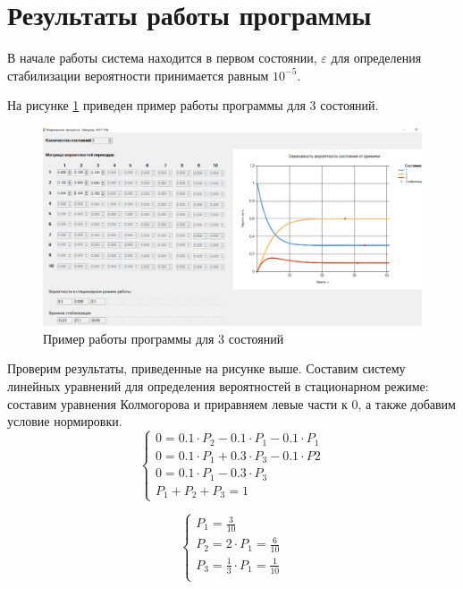 \documentclass[14pt, a4paper]{extarticle}
\begin{document}
\section{Результаты работы программы}

В начале работы система находится в первом состоянии, $\varepsilon$ для определения стабилизации вероятности принимается равным $10^{-5}$.



\newpage
На рисунке \ref{pic:1} приведен пример работы программы для 3 состояний.
\begin{figure}[h]
	\begin{center}
		{\includegraphics[scale=0.45]{pictures/1.png}
			\caption{Пример работы программы для 3 состояний}
			\label{pic:1}}
	\end{center}
\end{figure}

Проверим результаты, приведенные на рисунке выше. Составим систему линейных уравнений для определения вероятностей в стационарном режиме: составим уравнения Колмогорова и приравняем левые части к 0, а также добавим условие нормировки.
\begin{equation}
	\left\{\begin{array}{l}
		0 = 0.1 \cdot P_2 - 0.1 \cdot P_1 - 0.1 \cdot P_1 \\
		0 = 0.1 \cdot P_1 + 0.3 \cdot P_3 - 0.1 \cdot P2 \\
		0 = 0.1 \cdot P_1 - 0.3 \cdot P_3 \\
		P_1 + P_2 + P_3 = 1
	\end{array}\right.
\end{equation}

\begin{equation}
	\left\{\begin{array}{l}
		P_1 = \frac{3}{10} \\
		P_2 = 2 \cdot P_1 = \frac{6}{10} \\
		P_3 = \frac{1}{3} \cdot P_1 = \frac{1}{10} \\
	\end{array}\right.
\end{equation}
\end{document}
